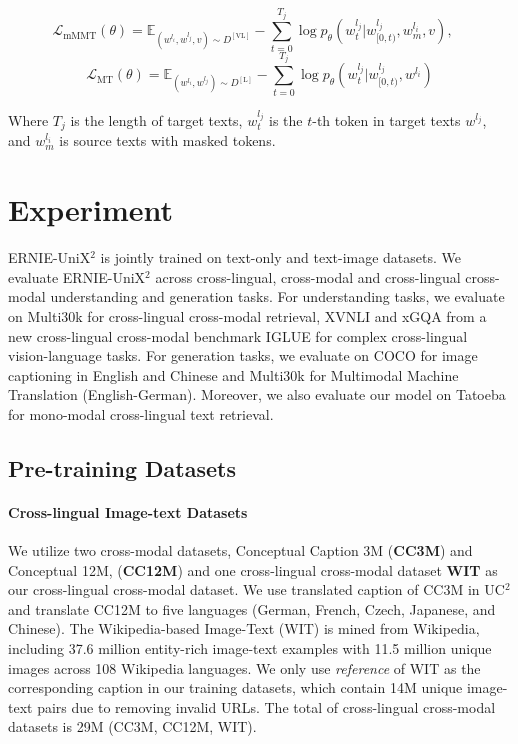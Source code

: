 \documentclass{article}
\begin{document}
\begin{equation}
    \mathcal{L}_{\mathrm{mMMT}}(\theta)=\mathbb{E}_{(w^{l_{i}},w^{l_{j}},v)\sim D^{[\mathrm{VL}]}} -\sum_{t=0}^{T_{j}}\log{p_{\theta}(w ^{l_{j}}_{t}|w_{[0,t)}^{l_{j}},w^{l_i}_m,v)}, \quad
    \end{equation}
\begin{equation}
    \mathcal{L}_{\mathrm{MT}}(\theta)=\mathbb{E}_{(w^{l_{i}},w^{l_{j}})\sim D^{[\mathrm{L}]}} -\sum_{t=0}^{T_{j}}\log{p_{\theta}(w^{l_{j}}_{t}|w_{[0,t)}^{l_{j}},w^{l_i})}
\end{equation}

Where $T_j$ is the length of target texts, $w^{l_j}_{t}$ is the $t$-th token in target texts $w^{l_j}$, and $w_{m}^{l_i}$ is source texts with masked tokens.

\section{Experiment}
ERNIE-UniX$^{2}$ is jointly trained on text-only and text-image datasets. We evaluate ERNIE-UniX$^{2}$ across cross-lingual, cross-modal and cross-lingual cross-modal understanding and generation tasks. For understanding tasks,
 we evaluate on Multi30k \cite{elliott-etal-2016-multi30k} for cross-lingual cross-modal retrieval, XVNLI \cite{xvnli-lingual} and xGQA \cite{xGQA2021} from a new cross-lingual cross-modal benchmark IGLUE \cite{iglue2022} for complex cross-lingual vision-language tasks. For generation tasks, we evaluate on COCO \cite{mscoco,cococn} for image captioning in English and Chinese and Multi30k \cite{elliott-etal-2016-multi30k} for Multimodal Machine Translation (English-German). Moreover, we also evaluate our model on Tatoeba \cite{tatoeba} for mono-modal cross-lingual text retrieval.
 
\subsection{Pre-training Datasets}
\paragraph{Cross-lingual Image-text Datasets}
We utilize two cross-modal datasets, Conceptual Caption 3M (\textbf{CC3M}) and Conceptual 12M, (\textbf{CC12M}) \cite{cc12m} and one cross-lingual cross-modal dataset \textbf{WIT} \cite{wit2021} as our cross-lingual cross-modal dataset. We use translated caption of CC3M in UC$^2$ \cite{UC22021} and translate CC12M to five languages (German, French, Czech, Japanese, and Chinese). The Wikipedia-based Image-Text (WIT) \cite{wit2021} is mined from Wikipedia, including 37.6 million entity-rich image-text examples with 11.5 million unique images across 108 Wikipedia languages. We only use \textit{reference} of WIT as the corresponding caption in our training datasets, which contain 14M unique image-text pairs due to removing invalid URLs. The total of cross-lingual cross-modal datasets is 29M (CC3M, CC12M, WIT).
\end{document}
